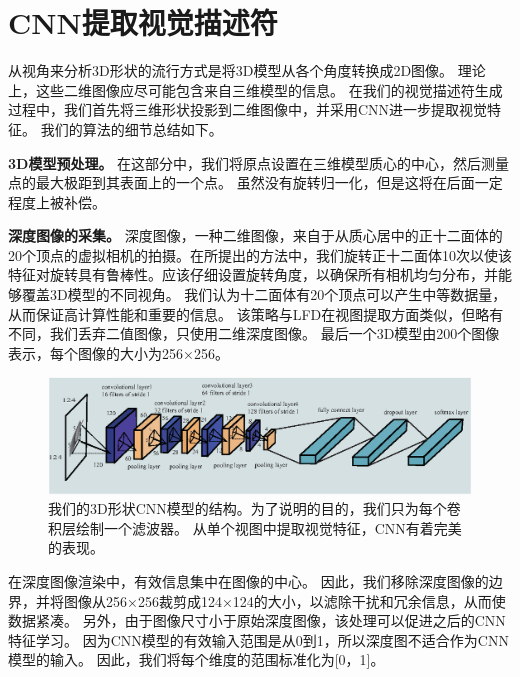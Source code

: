 \section{CNN提取视觉描述符}

从视角来分析3D形状的流行方式是将3D模型从各个角度转换成2D图像。 理论上，这些二维图像应尽可能包含来自三维模型的信息。 在我们的视觉描述符生成过程中，我们首先将三维形状投影到二维图像中，并采用CNN进一步提取视觉特征。 我们的算法的细节总结如下。

\textbf {3D模型预处理。} 在这部分中，我们将原点设置在三维模型质心的中心，然后测量点的最大极距到其表面上的一个点。 虽然没有旋转归一化，但是这将在后面一定程度上被补偿。

\textbf{深度图像的采集。} 深度图像，一种二维图像，来自于从质心居中的正十二面体的20个顶点的虚拟相机的拍摄。在所提出的方法中，我们旋转正十二面体10次以使该特征对旋转具有鲁棒性。应该仔细设置旋转角度，以确保所有相机均匀分布，并能够覆盖3D模型的不同视角。 我们认为十二面体有20个顶点可以产生中等数据量，从而保证高计算性能和重要的信息。 该策略与LFD在视图提取方面类似，但略有不同，我们丢弃二值图像，只使用二维深度图像。 最后一个3D模型由200个图像表示，每个图像的大小为256×256。
\begin{figure}[tbhp]
\begin{center}
\includegraphics[width=0.9\linewidth]{figures/CNN_LSTM_view.eps}
\end{center} 
\vspace{-4mm}
\caption{我们的3D形状CNN模型的结构。为了说明的目的，我们只为每个卷积层绘制一个滤波器。 从单个视图中提取视觉特征，CNN有着完美的表现。} \label{fig_CNN_view}
\end{figure}
在深度图像渲染中，有效信息集中在图像的中心。 因此，我们移除深度图像的边界，并将图像从256×256裁剪成124×124的大小，以滤除干扰和冗余信息，从而使数据紧凑。 另外，由于图像尺寸小于原始深度图像，该处理可以促进之后的CNN特征学习。 因为CNN模型的有效输入范围是从0到1，所以深度图不适合作为CNN模型的输入。 因此，我们将每个维度的范围标准化为[0，1]。



